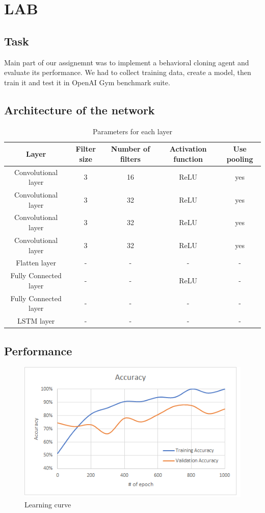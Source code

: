 \documentclass{scrartcl}
\begin{document}
\section*{LAB}
\subsection*{Task}
Main part of our assignemnt was to implement a behavioral cloning agent and evaluate its performance. We had to collect training data, create a model, then train it and test it in OpenAI Gym benchmark suite.

\subsection*{Architecture of the network}

\begin{table}[h]
	\centering
\begin{tabular}{|c||c|c||c||c|}
	\hline
	\textbf{Layer} & \textbf{Filter size} & \textbf{Number of filters} & \textbf{Activation function} & \textbf{Use pooling}  \\ \hline \hline
	Convolutional layer & 3 & 16 & ReLU & yes \\ \hline
	Convolutional layer & 3 & 32  & ReLU & yes \\ \hline
	Convolutional layer & 3  & 32 & ReLU & yes \\ \hline
	Convolutional layer & 3 & 32 & ReLU & yes \\ \hline
	Flatten layer & -  & - & - & -  \\ \hline
	Fully Connected layer  & - & - & ReLU & - \\ \hline
	Fully Connected layer  & - & - & - & - \\ \hline	
	LSTM layer  & - & - & - & - \\ \hline
\end{tabular}
\caption{Parameters for each layer}
\end{table}

\subsection*{Performance}

\begin{figure}[H]
	\centering
	\includegraphics[scale=0.6]{Accuracy}
	\caption{Learning curve}
	\label{fig:1}
\end{figure}
\end{document}
